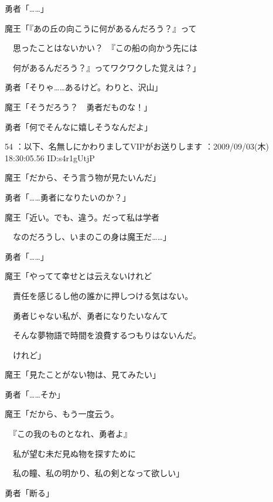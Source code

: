 \documentclass[a4j,twocolumn]{tarticle}
\begin{document}
勇者「……」 



魔王「『あの丘の向こうに何があるんだろう？』って\par{} 
　思ったことはないかい？　『この船の向かう先には\par{} 
　何があるんだろう？』ってワクワクした覚えは？」 



勇者「そりゃ……あるけど。わりと、沢山」 



魔王「そうだろう？　勇者だものな！」\par{} 
勇者「何でそんなに嬉しそうなんだよ」

	 

	

54 ：以下、名無しにかわりましてVIPがお送りします ：2009/09/03(木) 18:30:05.56 ID:s4r1gUtjP 


魔王「だから、そう言う物が見たいんだ」\par{} 
勇者「……勇者になりたいのか？」 



魔王「近い。でも、違う。だって私は学者\par{} 
　なのだろうし、いまのこの身は魔王だ……」 



勇者「……」 



魔王「やってて幸せとは云えないけれど\par{} 
　責任を感じるし他の誰かに押しつける気はない。\par{} 
　勇者じゃない私が、勇者になりたいなんて \par{}
　そんな夢物語で時間を浪費するつもりはないんだ。\par{} 
　けれど」 



魔王「見たことがない物は、見てみたい」 



勇者「……そか」 



魔王「だから、もう一度云う。\par{} 
　『この我のものとなれ、勇者よ』\par{} 
　私が望む未だ見ぬ物を探すために\par{} 
　私の瞳、私の明かり、私の剣となって欲しい」 



勇者「断る」 

	
    
    
\end{document}
